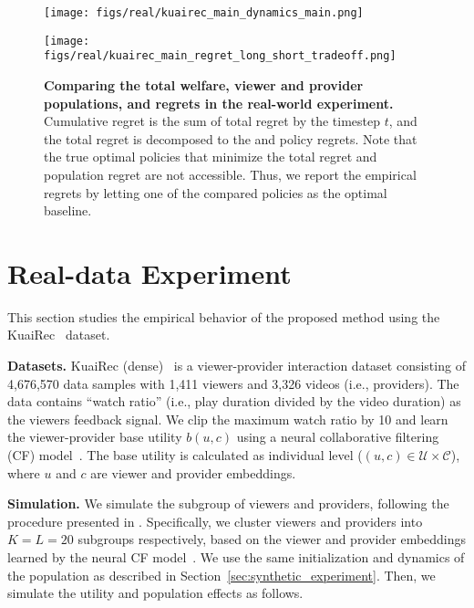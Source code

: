 \begin{figure*}
\begin{minipage}{0.99\hsize}
  \centering
  \texttt{[image: figs/real/kuairec\_main\_dynamics\_main.png]} 
  \vspace{1mm}
\end{minipage}
\begin{minipage}{0.99\hsize}
  \centering
  \texttt{[image: figs/real/kuairec\_main\_regret\_long\_short\_tradeoff.png]} 
  \caption{\textbf{Comparing the total welfare, viewer and provider populations, and regrets in the real-world experiment.} 
  Cumulative regret is the sum of total regret by the timestep $t$, and the total regret is decomposed to the and policy regrets. Note that the true optimal policies that minimize the total regret and population regret are not accessible. Thus, we report the empirical regrets by letting one of the compared policies as the optimal baseline.}
  \label{fig:real_dynamics}
  \vspace{3mm}
\end{minipage}
\end{figure*}


\section{Real-data Experiment}

This section studies the empirical behavior of the proposed method using 
the KuaiRec~\citep{gao2022kuairec} dataset.

\textbf{Datasets.} \; KuaiRec (dense)~\citep{gao2022kuairec} is a viewer-provider interaction dataset consisting of 4,676,570 data samples with 1,411 viewers and 3,326 videos (i.e., providers). The data contains ``watch ratio'' (i.e., play duration divided by the video duration) as the viewers feedback signal. We clip the maximum watch ratio by 10 and learn the viewer-provider base utility $b(u,c)$ using a neural collaborative filtering (CF) model~\citep{he2017neural}. The base utility is calculated as individual level ($(u, c) \in \mathcal{U} \times \mathcal{C}$), where $u$ and $c$ are viewer and provider embeddings.

\textbf{Simulation.} \; 
We simulate the subgroup of viewers and providers, following the procedure presented in \citep{bose2023initializing}. Specifically, we cluster viewers and providers into $K = L = 20$ subgroups respectively, based on the viewer and provider embeddings learned by the neural CF model~\citep{he2017neural}. 
We use the same initialization and dynamics of the population as described in Section~\ref{sec:synthetic_experiment}.
Then, we simulate the utility and population effects as follows.

